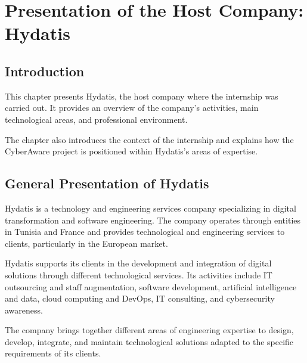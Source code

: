 \documentclass[12pt,a4paper]{report}
\begin{document}


\chapter{Presentation of the Host Company: Hydatis}

\section{Introduction}

This chapter presents Hydatis, the host company where the internship was carried out. It provides an overview of the company's activities, main technological areas, and professional environment.

The chapter also introduces the context of the internship and explains how the CyberAware project is positioned within Hydatis's areas of expertise.

\section{General Presentation of Hydatis}

Hydatis is a technology and engineering services company specializing in digital transformation and software engineering. The company operates through entities in Tunisia and France and provides technological and engineering services to clients, particularly in the European market.

Hydatis supports its clients in the development and integration of digital solutions through different technological services. Its activities include IT outsourcing and staff augmentation, software development, artificial intelligence and data, cloud computing and DevOps, IT consulting, and cybersecurity awareness.

The company brings together different areas of engineering expertise to design, develop, integrate, and maintain technological solutions adapted to the specific requirements of its clients.
\end{document}
